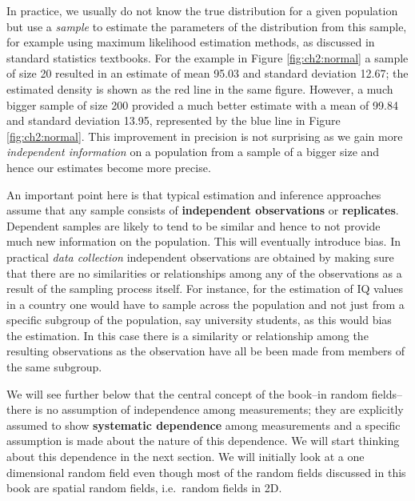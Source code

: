 In practice, we usually do not know the true distribution for a given population but use a \textit{sample} to estimate the parameters of the distribution from this sample, for example using maximum likelihood estimation methods, as discussed in standard statistics textbooks. For the example in Figure \ref{fig:ch2:normal} a sample of size 20 resulted in an estimate of mean 95.03 and standard deviation 12.67; the estimated density is shown as the red line in the same figure. However, a much bigger sample of size 200 provided a much better estimate with a mean of 99.84 and standard deviation 13.95, represented by the blue line in Figure \ref{fig:ch2:normal}. This improvement in precision is not surprising as we gain more \textit{independent information} on a population from a sample of a bigger size and hence our estimates become more precise. 

An important point here is that typical estimation and inference approaches assume that any sample consists of \textbf{independent observations} or \textbf{replicates}.  Dependent samples are likely to tend to be similar and hence to not provide much new information on the population. This will eventually introduce bias.  In practical \textit{data collection} independent observations are obtained by making sure that there are no similarities or relationships among any of the observations as a result of the sampling process itself. For instance, for the estimation of IQ values in a country one would have to sample across the population and not just from a specific subgroup  of the population, say university students, as this would bias the estimation. In this case there is a similarity or relationship among the resulting observations as the observation have all be been made from members of the same subgroup.

We will see further below that the central concept of the book--in random fields--there is no assumption of independence among measurements; they are explicitly assumed to show \textbf{systematic dependence} among measurements and a specific  assumption is made about the nature of this dependence. We will start thinking about this dependence in the next section. We will initially look at a one dimensional random field even though most of the random fields discussed in this book are spatial random fields, i.e.\ random fields in 2D.

